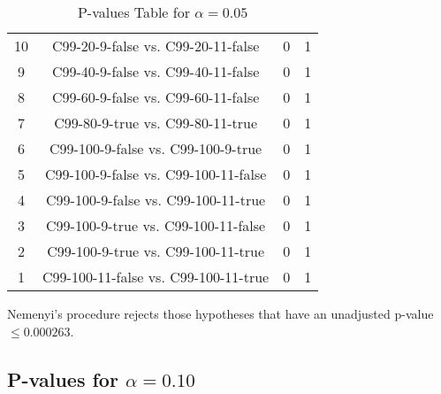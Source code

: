\documentclass[a4paper,10pt]{article}
\begin{document}
\begin{landscape}
\begin{table}[!htp]
\begin{tabular}{cccc}
10&C99-20-9-false vs. C99-20-11-false&0&1\\
9&C99-40-9-false vs. C99-40-11-false&0&1\\
8&C99-60-9-false vs. C99-60-11-false&0&1\\
7&C99-80-9-true vs. C99-80-11-true&0&1\\
6&C99-100-9-false vs. C99-100-9-true&0&1\\
5&C99-100-9-false vs. C99-100-11-false&0&1\\
4&C99-100-9-false vs. C99-100-11-true&0&1\\
3&C99-100-9-true vs. C99-100-11-false&0&1\\
2&C99-100-9-true vs. C99-100-11-true&0&1\\
1&C99-100-11-false vs. C99-100-11-true&0&1\\
\hline
\end{tabular}
\caption{P-values Table for $\alpha=0.05$}
\end{table}Nemenyi's procedure rejects those hypotheses that have an unadjusted p-value $\le0.000263$.

\pagebreak

\subsection{P-values for $\alpha=0.10$}


\end{landscape}
\end{document}

